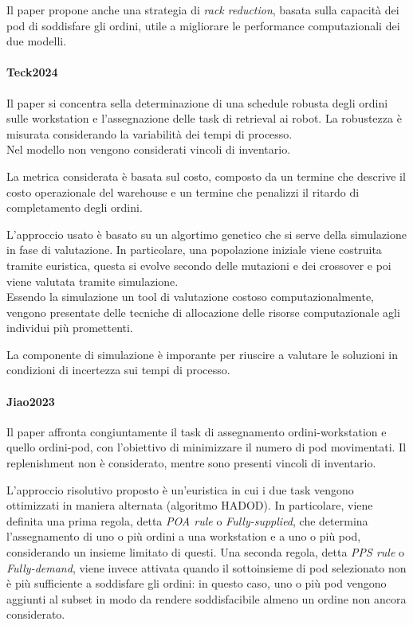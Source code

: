 \documentclass{article}
\begin{document}
Il paper propone anche una strategia di \emph{rack reduction}, basata sulla capacità dei pod di soddisfare gli ordini, utile a migliorare le performance computazionali dei due modelli.




\paragraph{Teck2024 \cite{Teck2024}}
Il paper si concentra sella determinazione di una schedule robusta degli ordini sulle workstation e l'assegnazione delle task di retrieval ai robot. La robustezza è misurata considerando la variabilità dei tempi di processo. \\
Nel modello non vengono considerati vincoli di inventario.

La metrica considerata è basata sul costo, composto da un termine che descrive il costo operazionale del warehouse e un termine che penalizzi il ritardo di completamento degli ordini.

L'approccio usato è basato su un algortimo genetico che si serve della simulazione in fase di valutazione. In particolare, una popolazione iniziale viene costruita tramite euristica, questa si evolve secondo delle mutazioni e dei crossover e poi viene valutata tramite simulazione. \\
Essendo la simulazione un tool di valutazione costoso computazionalmente, vengono presentate delle tecniche di allocazione delle risorse computazionale agli individui più promettenti.

La componente di simulazione è imporante per riuscire a valutare le soluzioni in condizioni di incertezza sui tempi di processo.


\paragraph{Jiao2023 \cite{Jiao2023}}
Il paper affronta congiuntamente il task di assegnamento ordini-workstation e quello ordini-pod, con l'obiettivo di minimizzare il numero di pod movimentati. Il replenishment non è considerato, mentre sono presenti vincoli di inventario.

L'approccio risolutivo proposto è un'euristica in cui i due task vengono ottimizzati in maniera alternata (algoritmo HADOD). In particolare, viene definita una prima regola, detta \emph{POA rule} o \emph{Fully-supplied}, che determina l'assegnamento di uno o più ordini a una workstation e a uno o più pod, considerando un insieme limitato di questi. Una seconda regola, detta \emph{PPS rule} o \emph{Fully-demand}, viene invece attivata quando il sottoinsieme di pod selezionato non è più sufficiente a soddisfare gli ordini: in questo caso, uno o più pod vengono aggiunti al subset in modo da rendere soddisfacibile almeno un ordine non ancora considerato.
\end{document}
